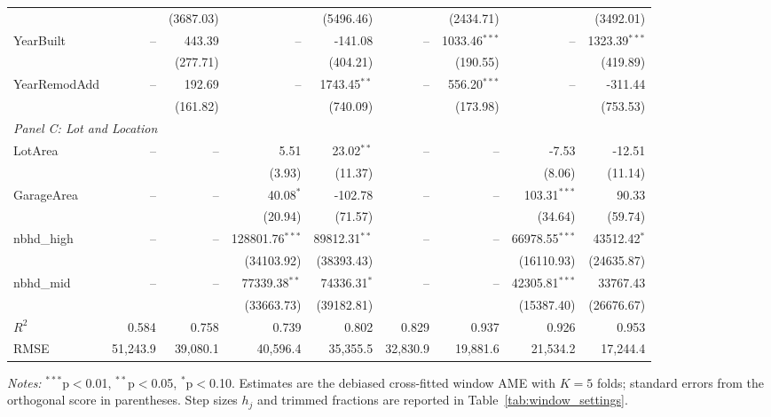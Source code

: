 \documentclass[12pt,a4paper]{article}
\numberwithin{equation}{section}
\theoremstyle{plain}
\theoremstyle{definition}
\begin{document}
\begin{table}[htbp]
{\begin{threeparttable}
\begin{tabular}{lrrrrrrrr}
					&  & (3687.03) &  & (5496.46) &  & (2434.71) &  & (3492.01) \\
					\quad YearBuilt & -- & 443.39 & -- & -141.08 & -- & 1033.46$^{***}$ & -- & 1323.39$^{***}$ \\
					&  & (277.71) &  & (404.21) &  & (190.55) &  & (419.89) \\
					\quad YearRemodAdd & -- & 192.69 & -- & 1743.45$^{**}$ & -- & 556.20$^{***}$ & -- & -311.44 \\
					&  & (161.82) &  & (740.09) &  & (173.98) &  & (753.53) \\
					\midrule
					\multicolumn{9}{l}{\textit{Panel C: Lot and Location}} \\
					\quad LotArea & -- & -- & 5.51 & 23.02$^{**}$ & -- & -- & -7.53 & -12.51 \\
					&  &  & (3.93) & (11.37) &  &  & (8.06) & (11.14) \\
					\quad GarageArea & -- & -- & 40.08$^{*}$ & -102.78 & -- & -- & 103.31$^{***}$ & 90.33 \\
					&  &  & (20.94) & (71.57) &  &  & (34.64) & (59.74) \\
					\quad nbhd\_high & -- & -- & 128801.76$^{***}$ & 89812.31$^{**}$ & -- & -- & 66978.55$^{***}$ & 43512.42$^{*}$ \\
					&  &  & (34103.92) & (38393.43) &  &  & (16110.93) & (24635.87) \\
					\quad nbhd\_mid & -- & -- & 77339.38$^{**}$ & 74336.31$^{*}$ & -- & -- & 42305.81$^{***}$ & 33767.43 \\
					&  &  & (33663.73) & (39182.81) &  &  & (15387.40) & (26676.67) \\
					\midrule
					$R^2$ & 0.584 & 0.758 & 0.739 & 0.802 & 0.829 & 0.937 & 0.926 & 0.953 \\
					RMSE & 51,243.9 & 39,080.1 & 40,596.4 & 35,355.5 & 32,830.9 & 19,881.6 & 21,534.2 & 17,244.4 \\
					\bottomrule
					\end{tabular}
					\begin{tablenotes}
					\footnotesize
					\item \textit{Notes:} $^{***}$p$<$0.01, $^{**}$p$<$0.05, $^{*}$p$<$0.10. Estimates are the debiased cross-fitted window AME with $K=5$ folds; standard errors from the orthogonal score in parentheses. Step sizes $h_j$ and trimmed fractions are reported in Table~\ref{tab:window_settings}.
					\end{tablenotes}
			\end{threeparttable}
		}%
	\end{table}
	
\end{document}
